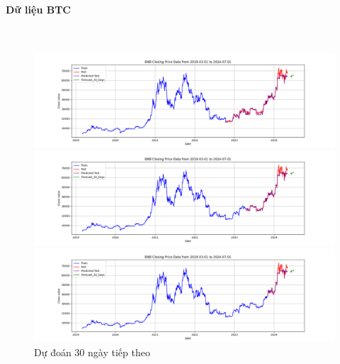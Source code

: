 \documentclass[conference]{IEEEtran}
\begin{document}
	\paragraph{\textbf{Dữ liệu BTC}} \mbox{} \\
	\begin{figure}[H]
		\centering
		\begin{minipage}{0.15\textwidth}
			\centering
			\includegraphics[width=1\textwidth]{Figure/RandomForest_BTC_30days_73.png}
		\end{minipage}
		\hfill
		\begin{minipage}{0.15\textwidth}
			\centering
			\includegraphics[width=1\textwidth]{Figure/RandomForest_BTC_30days_82.png}
		\end{minipage}
		\hfill
		\begin{minipage}{0.15\textwidth}
			\centering
			\includegraphics[width=1\textwidth]{Figure/RandomForest_BTC_30days_91.png}
		\end{minipage}
		\caption{Dự đoán 30 ngày tiếp theo}
		\label{fig:1}
	\end{figure}
	
\end{document}
